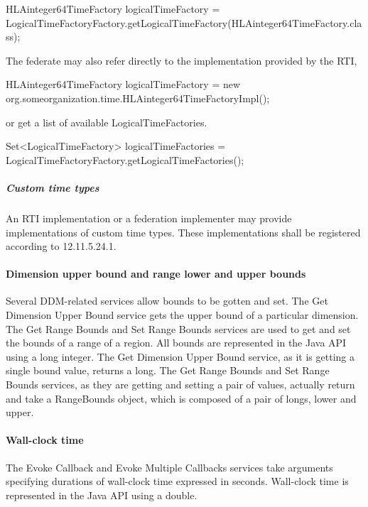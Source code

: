 \begin{compactstdpage}
{\ttfamily\fontsize{8.3}{9.6}\selectfont
HLAinteger64TimeFactory logicalTimeFactory =\\
LogicalTimeFactoryFactory.getLogicalTimeFactory(HLAinteger64TimeFactory.class);}

    The federate may also refer directly to the implementation provided by the RTI,

        {\ttfamily\fontsize{8.3}{9.6}\selectfont
    HLAinteger64TimeFactory logicalTimeFactory = new\\
    org.someorganization.time.HLAinteger64TimeFactoryImpl();}

    or get a list of available LogicalTimeFactories.

        {\ttfamily\fontsize{8.3}{9.6}\selectfont
    Set\textless{}LogicalTimeFactory\textgreater{} logicalTimeFactories =\\
    LogicalTimeFactoryFactory.getLogicalTimeFactories();}

    \subparagraph{Custom time types}

    An RTI implementation or a federation implementer may provide implementations of custom time types. These implementations shall be registered according to 12.11.5.24.1.

    \paragraph{Dimension upper bound and range lower and upper bounds}

    Several DDM-related services allow bounds to be gotten and set. The Get Dimension Upper Bound service gets the upper bound of a particular dimension. The Get Range Bounds and Set Range Bounds services are used to get and set the bounds of a range of a region. All bounds are represented in the Java API using a long integer. The Get Dimension Upper Bound service, as it is getting a single bound value, returns a long. The Get Range Bounds and Set Range Bounds services, as they are getting and setting a pair of values, actually return and take a RangeBounds object, which is composed of a pair of longs, lower and upper.

    \paragraph{Wall-clock time}

    The Evoke Callback and Evoke Multiple Callbacks services take arguments specifying durations of wall-clock time expressed in seconds. Wall-clock time is represented in the Java API using a double.


\end{compactstdpage}
